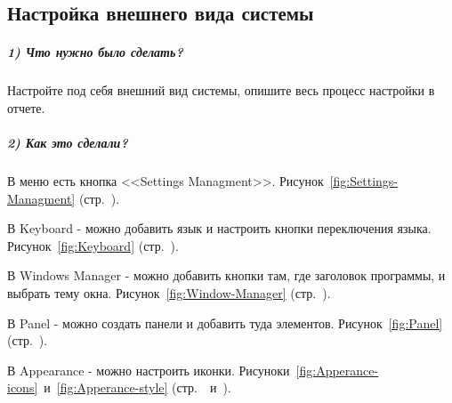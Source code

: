 \subsection{Настройка внешнего вида системы}

\subparagraph{1) Что нужно было сделать?}

Настройте под себя внешний вид системы, опишите весь процесс настройки в отчете.

\subparagraph{2) Как это сделали?}

В меню есть кнопка <<Settings Managment>>.
Рисунок~\ref{fig:Settings-Managment}
(стр.~\pageref{fig:Settings-Managment}).

В Keyboard - можно добавить язык и настроить кнопки переключения языка.
Рисунок~\ref{fig:Keyboard}
(стр.~\pageref{fig:Keyboard}).

В Windows Manager - можно добавить кнопки там, где заголовок программы, и выбрать тему окна.
Рисунок~\ref{fig:Window-Manager}
(стр.~\pageref{fig:Window-Manager}).

В Panel - можно создать панели и добавить туда элементов.
Рисунок~\ref{fig:Panel}
(стр.~\pageref{fig:Panel}).

В Appearance - можно настроить иконки.
Рисуноки~\ref{fig:Apperance-icons}~и~\ref{fig:Apperance-style}
(стр.~\pageref{fig:Apperance-icons}~и~\pageref{fig:Apperance-style}).

